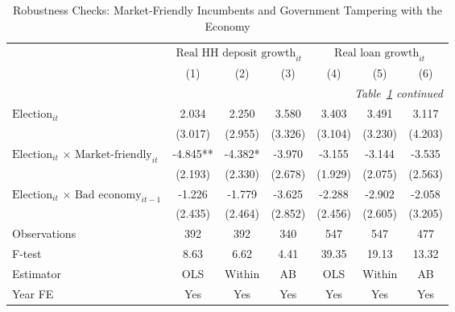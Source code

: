 \begin{longtable}{m{5cm}*{6}{c}}                                         \caption{Robustness Checks: Market-Friendly Incumbents and Government Tampering with the Economy\label{govtemprl}}\\                                         \toprule                                         &\multicolumn{3}{c}{$\text{Real HH deposit growth}_{it}$} & \multicolumn{3}{c}{$\text{Real loan growth}_{it}$} \\ \cmidrule(lr){2-4} \cmidrule(lr){5-7}
                    &         (1)   &         (2)   &         (3)   &         (4)   &         (5)   &         (6)   \\
\midrule\endfirsthead                                         \multicolumn{7}{r}{\textit{Table~\ref{govtemprl} continued}} \\                                         \toprule\endhead\midrule\endfoot\endlastfoot
$\text{Election}_{it}$&       2.034   &       2.250   &       3.580   &       3.403   &       3.491   &       3.117   \\
                    &     (3.017)   &     (2.955)   &     (3.326)   &     (3.104)   &     (3.230)   &     (4.203)   \\
\multirow{2}{4.5cm}{$\text{Election}_{it}$ $\times$ $\text{Market-friendly}_{it}$}&      -4.845** &      -4.382*  &      -3.970   &      -3.155   &      -3.144   &      -3.535   \\
                    &     (2.193)   &     (2.330)   &     (2.678)   &     (1.929)   &     (2.075)   &     (2.563)   \\
\multirow{2}{4.5cm}{$\text{Election}_{it}$ $\times$ $\text{Bad economy}_{it-1}$}&      -1.226   &      -1.779   &      -3.625   &      -2.288   &      -2.902   &      -2.058   \\
                    &     (2.435)   &     (2.464)   &     (2.852)   &     (2.456)   &     (2.605)   &     (3.205)   \\
\midrule
Observations        &         392   &         392   &         340   &         547   &         547   &         477   \\
F-test              &        8.63   &        6.62   &        4.41   &       39.35   &       19.13   &       13.32   \\
Estimator           &         OLS   &      Within   &          AB   &         OLS   &      Within   &          AB   \\
Year FE             &         Yes   &         Yes   &         Yes   &         Yes   &         Yes   &         Yes   \\

\end{longtable}
